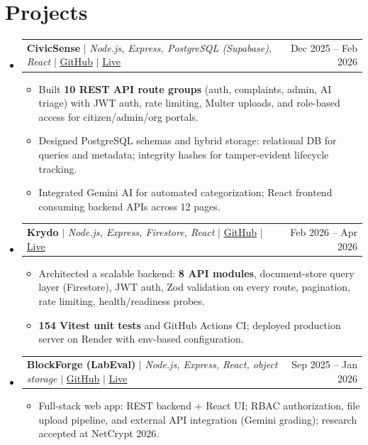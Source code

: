 \documentclass[letterpaper,11pt]{article}
\makeatletter
\newcommand{\resumeItem}[1]{
  \item\small{
    {#1 \vspace{-5pt}}
  }
}
\newcommand{\resumeProjectHeading}[2]{
  \item
    \begin{tabular*}{0.97\textwidth}{l@{\extracolsep{\fill}}r}
      \small#1 & #2 \\
    \end{tabular*}\vspace{-9pt}
}
\newcommand{\resumeSubHeadingListStart}{\begin{itemize}[leftmargin=0.15in, label={}]}
\newcommand{\resumeSubHeadingListEnd}{\end{itemize}}
\newcommand{\resumeItemListStart}{\begin{itemize}}
\newcommand{\resumeItemListEnd}{\end{itemize}\vspace{-10pt}}
\makeatother
\begin{document}
\section{Projects}
  \resumeSubHeadingListStart
    \resumeProjectHeading
      {\textbf{CivicSense} $|$ \emph{Node.js, Express, PostgreSQL (Supabase), React} $|$ \href{https://github.com/nishant-uxs/CivicSense}{\underline{GitHub}} $|$ \href{https://civic-sense-six.vercel.app}{\underline{Live}}}{Dec 2025 -- Feb 2026}
      \resumeItemListStart
        \resumeItem{Built \textbf{10 REST API route groups} (auth, complaints, admin, AI triage) with JWT auth, rate limiting, Multer uploads, and role-based access for citizen/admin/org portals.}
        \resumeItem{Designed PostgreSQL schemas and hybrid storage: relational DB for queries and metadata; integrity hashes for tamper-evident lifecycle tracking.}
        \resumeItem{Integrated Gemini AI for automated categorization; React frontend consuming backend APIs across 12 pages.}
      \resumeItemListEnd
    \resumeProjectHeading
      {\textbf{Krydo} $|$ \emph{Node.js, Express, Firestore, React} $|$ \href{https://github.com/nishant-uxs/krydo}{\underline{GitHub}} $|$ \href{https://krydo.onrender.com}{\underline{Live}}}{Feb 2026 -- Apr 2026}
      \resumeItemListStart
        \resumeItem{Architected a scalable backend: \textbf{8 API modules}, document-store query layer (Firestore), JWT auth, Zod validation on every route, pagination, rate limiting, health/readiness probes.}
        \resumeItem{\textbf{154 Vitest unit tests} and GitHub Actions CI; deployed production server on Render with env-based configuration.}
      \resumeItemListEnd
    \resumeProjectHeading
      {\textbf{BlockForge (LabEval)} $|$ \emph{Node.js, Express, React, object storage} $|$ \href{https://github.com/nishant-uxs/labeval}{\underline{GitHub}} $|$ \href{https://blockchain-labeval.onrender.com}{\underline{Live}}}{Sep 2025 -- Jan 2026}
      \resumeItemListStart
        \resumeItem{Full-stack web app: REST backend + React UI; RBAC authorization, file upload pipeline, and external API integration (Gemini grading); research accepted at NetCrypt 2026.}
      \resumeItemListEnd
  \resumeSubHeadingListEnd
\end{document}
